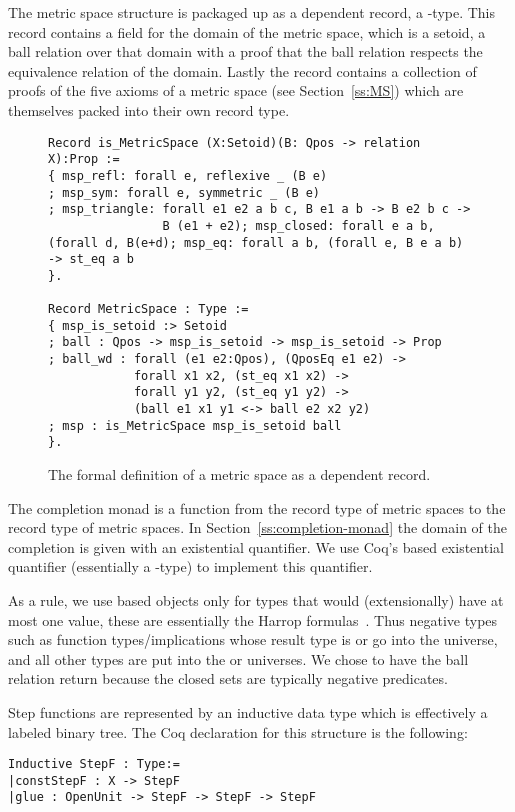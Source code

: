 \documentclass{elsarticle}
\newcommand{\tmtexttt}[1]{{\ttfamily{#1}}}
\begin{document}
The metric space structure is packaged up as a dependent record, a
-type. This record contains a field for the domain of the metric
space, which is a setoid, a ball relation over that domain with a proof that
the ball relation respects the equivalence relation of the domain. Lastly the
record contains a collection of proofs of the five axioms of a metric space
(see Section~\ref{ss:MS}) which are themselves packed into their own record
type.

\begin{figure}
\begin{verbatim}
Record is_MetricSpace (X:Setoid)(B: Qpos -> relation X):Prop :=
{ msp_refl: forall e, reflexive _ (B e)
; msp_sym: forall e, symmetric _ (B e)
; msp_triangle: forall e1 e2 a b c, B e1 a b -> B e2 b c ->
                B (e1 + e2); msp_closed: forall e a b,(forall d, B(e+d); msp_eq: forall a b, (forall e, B e a b) -> st_eq a b
}.

Record MetricSpace : Type :=
{ msp_is_setoid :> Setoid
; ball : Qpos -> msp_is_setoid -> msp_is_setoid -> Prop
; ball_wd : forall (e1 e2:Qpos), (QposEq e1 e2) ->
            forall x1 x2, (st_eq x1 x2) ->
            forall y1 y2, (st_eq y1 y2) ->
            (ball e1 x1 y1 <-> ball e2 x2 y2)
; msp : is_MetricSpace msp_is_setoid ball
}.
\end{verbatim}
\caption{The formal definition of a metric space as a dependent record.}
\end{figure}

The completion monad is a function from the record type of metric spaces to
the record type of metric spaces. In Section~\ref{ss:completion-monad} the
domain of the completion is given with an existential quantifier. We use
Coq's \tmtexttt{Set} based existential quantifier (essentially a
-type) to implement this quantifier.

As a rule, we use \tmtexttt{Prop} based objects only for types that would
(extensionally) have at most one value, these are essentially the Harrop
formulas~{\cite{lcf:spi:03}}. Thus negative types such as function
types/implications whose result type is  or  go into the
\tmtexttt{Prop} universe, and all other types are put into the \tmtexttt{Set}
or \tmtexttt{Type} universes. We chose to have the ball relation return
\tmtexttt{Prop} because the closed sets are typically negative predicates.

Step functions are represented by an inductive data type which is effectively
a labeled binary tree. The Coq declaration for this structure is the
following:
\begin{verbatim}
Inductive StepF : Type:=
|constStepF : X -> StepF
|glue : OpenUnit -> StepF -> StepF -> StepF
\end{verbatim}
\end{document}
